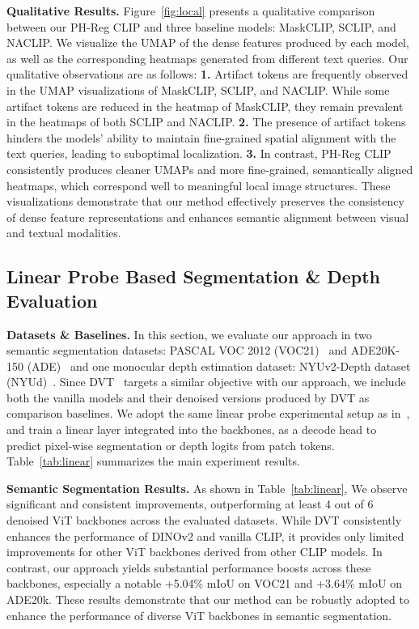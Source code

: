 \textbf{Qualitative Results.} Figure~\ref{fig:local} presents a qualitative comparison between our PH-Reg CLIP and three baseline models: MaskCLIP, SCLIP, and NACLIP. We visualize the UMAP of the dense features produced by each model, as well as the corresponding heatmaps generated from different text queries.
Our qualitative observations are as follows:
\textbf{1.} Artifact tokens are frequently observed in the UMAP visualizations of MaskCLIP, SCLIP, and NACLIP. While some artifact tokens are reduced in the heatmap of MaskCLIP, they remain prevalent in the heatmaps of both SCLIP and NACLIP.
\textbf{2.} The presence of artifact tokens hinders the models' ability to maintain fine-grained spatial alignment with the text queries, leading to suboptimal localization.
\textbf{3.} In contrast, PH-Reg CLIP consistently produces cleaner UMAPs and more fine-grained, semantically aligned heatmaps, which correspond well to meaningful local image structures.
These visualizations demonstrate that our method effectively preserves the consistency of dense feature representations and enhances semantic alignment between visual and textual modalities.

\vspace{-.2cm}
\subsection{Linear Probe Based Segmentation \& Depth Evaluation}\label{section_linear}
\vspace{-.2cm}
\textbf{Datasets \& Baselines.} In this section, we evaluate our approach in two semantic segmentation datasets: PASCAL VOC 2012 (VOC21)~\cite{everingham2015pascal} and ADE20K-150 (ADE)~\cite{ade20k} and one monocular depth estimation dataset: NYUv2-Depth dataset (NYUd)~\cite{silberman2012nyu}.
Since DVT~\cite{yang2024denoising} targets a similar objective with our approach, we include both the vanilla models and their denoised versions produced by DVT as comparison baselines.
We adopt the same linear probe experimental setup as in~\citep{yang2024denoising}, and train a linear layer integrated into the backbones, as a decode head to predict pixel-wise segmentation or depth logits from patch tokens.
Table~\ref{tab:linear} summarizes the main experiment results.



\textbf{Semantic Segmentation Results.}  As shown in Table~\ref{tab:linear}, We observe significant and consistent improvements, outperforming at least 4 out of 6 denoised ViT backbones across the evaluated datasets. 
While DVT consistently enhances the performance of DINOv2 and vanilla CLIP, it provides only limited improvements for other ViT backbones derived from other CLIP models. 
In contrast, our approach yields substantial performance boosts across these backbones, especially a notable +5.04\% mIoU on VOC21 and +3.64\% mIoU on ADE20k. These results demonstrate that our method can be robustly adopted to enhance the performance of diverse ViT backbones in semantic segmentation.

